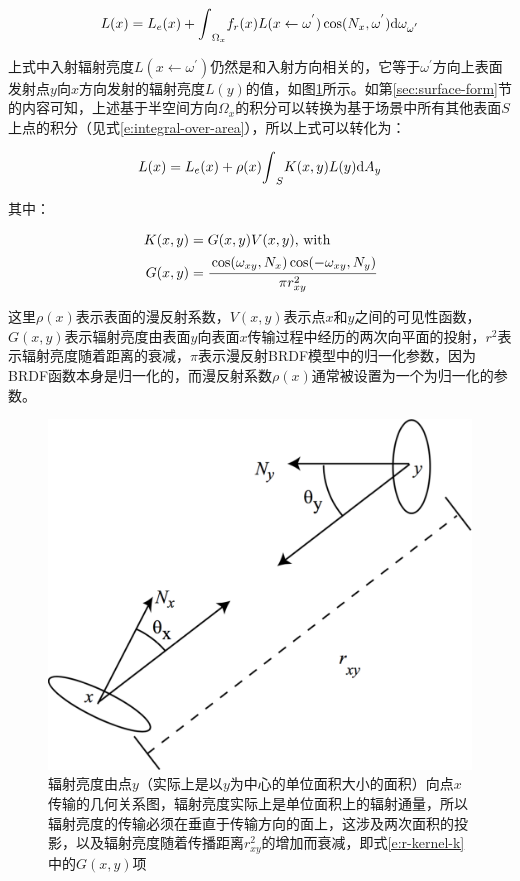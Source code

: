 \begin{equation}\label{e:r-radiosity-temp}
	L(x)=L_e(x)+{\rm \int}_{\Omega_x}f_r(x)L(x\leftarrow{\omega}^{'})\cos(N_x,{\omega}^{'}){\rm d}\omega_{{\omega}^{'}}
\end{equation}

上式中入射辐射亮度$L(x\leftarrow{\omega}^{'})$仍然是和入射方向相关的，它等于${\omega}^{'}$方向上表面发射点$y$向$x$方向发射的辐射亮度$L(y)$的值，如图\ref{f:r-the-geometry-of-the-surfaces}所示。如第\ref{sec:surface-form}节的内容可知，上述基于半空间方向$\Omega_x$的积分可以转换为基于场景中所有其他表面$S$上点的积分（见式\ref{e:integral-over-area}），所以上式可以转化为：

\begin{equation}
	L(x)=L_e(x)+\rho(x){\rm \int}_{S}K(x,y)L(y){\rm d}A_y
\end{equation}

\noindent 其中：

\begin{equation}\label{e:r-kernel-k}
\begin{aligned}
	K(x,y)&=G(x,y)V(x,y) \text{, with }\\
		G(x,y)&= \cfrac{\cos({\omega}_{xy},N_x)\cos(-{\omega}_{xy},N_y)}{\pi r^{2}_{xy}}
\end{aligned}
\end{equation}

\noindent 这里$\rho(x)$表示表面的漫反射系数，$V(x,y)$表示点$x$和$y$之间的可见性函数，$G(x,y)$表示辐射亮度由表面$y$向表面$x$传输过程中经历的两次向平面的投射，$r^{2}$表示辐射亮度随着距离的衰减，$\pi$表示漫反射BRDF模型中的归一化参数，因为BRDF函数本身是归一化的，而漫反射系数$\rho(x)$通常被设置为一个为归一化的参数。

\begin{figure}
\sidecaption
	\includegraphics[width=.55\textwidth]{graphics/gi/path-18}
	\caption{辐射亮度由点$y$（实际上是以$y$为中心的单位面积大小的面积）向点$x$传输的几何关系图，辐射亮度实际上是单位面积上的辐射通量，所以辐射亮度的传输必须在垂直于传输方向的面上，这涉及两次面积的投影，以及辐射亮度随着传播距离$r^{2}_{xy}$的增加而衰减，即式\ref{e:r-kernel-k}中的$G(x,y)$项}
	\label{f:r-the-geometry-of-the-surfaces}
\end{figure}

